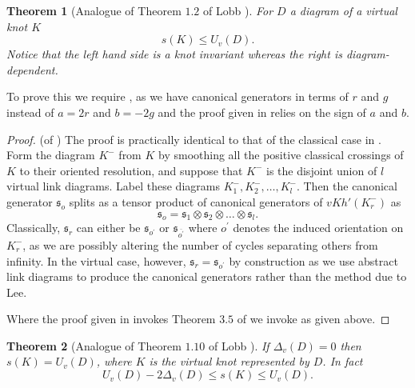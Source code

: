 \documentclass[10pt,oneside]{amsart}
\newtheorem{theorem}{Theorem}[section]
\theoremstyle{definition}
\numberwithin{equation}{section}
\begin{document}
\begin{theorem}[Analogue of Theorem \( 1.2 \) of Lobb \cite{Lobb2011}]
	\label{Thm:u}
	For \( D \) a diagram of a virtual knot \( K \)
	\begin{equation*}
	s ( K ) \leq U_v ( D ).
	\end{equation*}
	Notice that the left hand side is a knot invariant whereas the right is diagram-dependent.
\end{theorem}

To prove this we require , as we have canonical generators in terms of \( r \) and \( g \) instead of \( a = 2r \) and \( b = -2g \) and the proof given in \cite{Rasmussen2010} relies on the sign of \( a \) and \( b \).

\begin{proof}
	(of )
	The proof is practically identical to that of the classical case in \cite{Lobb2011}. Form the diagram \( K^{-} \) from \( K \) by smoothing all the positive classical crossings of \( K \) to their oriented resolution, and suppose that \( K^{-} \) is the disjoint union of \( l \) virtual link diagrams. Label these diagrams \( K^{-}_{1}, K^{-}_{2}, \dots, K^{-}_{l} \). Then the canonical generator \( {\mathfrak{s}}_o \) splits as a tensor product of canonical generators of \( {vKh} ' ( K^{-}_{r} ) \) as
	\begin{equation*}
	{\mathfrak{s}}_o = {\mathfrak{s}}_1 \otimes {\mathfrak{s}}_2 \otimes \dots \otimes {\mathfrak{s}}_l.
	\end{equation*}
	Classically, \( {\mathfrak{s}}_r \) can either be \( {\mathfrak{s}}_{o^{\prime}} \) or \( {\mathfrak{s}}_{\overline{o^{\prime}}} \) where \( o^{\prime} \) denotes the induced orientation on \( K^{-}_{r} \), as we are possibly altering the number of cycles separating others from infinity. In the virtual case, however, \( {\mathfrak{s}}_r = {\mathfrak{s}}_{o^{\prime}} \) by construction as we use abstract link diagrams to produce the canonical generators rather than the method due to Lee.
	
	Where the proof given in \cite{Lobb2011} invokes Theorem \( 3.5 \) of \cite{Rasmussen2010} we invoke  as given above.
\end{proof}

\begin{theorem}[Analogue of Theorem \( 1.10 \) of Lobb \cite{Lobb2011}]
	\label{Thm:delta}
	If \( \Delta_v ( D ) = 0 \) then \( s ( K ) = U_v ( D ) \), where \( K \) is the virtual knot represented by \( D \). In fact
	\begin{equation*}
	U_v ( D ) - 2 \Delta_v ( D ) \leq s ( K ) \leq U_v ( D ).
	\end{equation*}
\end{theorem}
\end{document}
